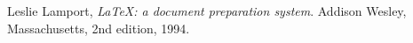   Leslie Lamport,
  \emph{LaTeX: a document preparation system}.
  Addison Wesley, Massachusetts,
  2nd edition,
  1994.
